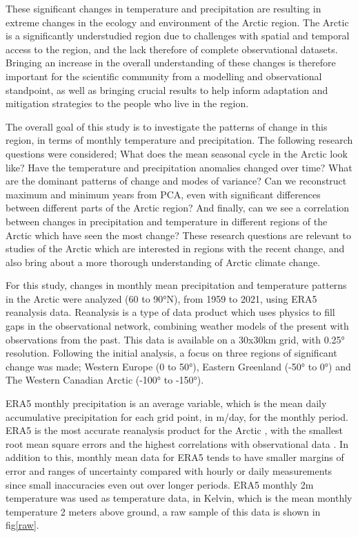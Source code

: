\documentclass[11pt, oneside]{article}
\begin{document}
These significant changes in temperature and precipitation are resulting in extreme changes in the ecology and environment of the Arctic region. The Arctic is a significantly understudied region due to challenges with spatial and temporal access to the region, and the lack therefore of complete observational datasets. Bringing an increase in the overall understanding of these changes is therefore important for the scientific community from a modelling and observational standpoint, as well as bringing crucial results to help inform adaptation and mitigation strategies to the people who live in the region.
 
The overall goal of this study is to investigate the patterns of change in this region, in terms of monthly temperature and precipitation. The following research questions were considered; What does the mean seasonal cycle in the Arctic look like? Have the temperature and precipitation anomalies changed over time? What are the dominant patterns of change and modes of variance? Can we reconstruct maximum and minimum years from PCA, even with significant differences between different parts of the Arctic region? And finally, can we see a correlation between changes in precipitation and temperature in different regions of the Arctic which have seen the most change? These research questions are relevant to studies of the Arctic which are interested in regions with the recent change, and also bring about a more thorough understanding of Arctic climate change.
 
For this study, changes in monthly mean precipitation and temperature patterns in the Arctic were analyzed (60 to 90°N), from 1959 to 2021, using ERA5 reanalysis data. Reanalysis is a type of data product which uses physics to fill gaps in the observational network, combining weather models of the present with observations from the past. This data is available on a 30x30km grid, with 0.25° resolution. Following the initial analysis, a focus on three regions of significant change was made; Western  Europe (0 to 50°), Eastern Greenland (-50° to 0°) and The Western Canadian Arctic (-100° to -150°).
 
ERA5 monthly precipitation is an average variable, which is the mean daily accumulative precipitation for each grid point, in m/day, for the monthly period. ERA5 is the most accurate reanalysis product for the Arctic \cite{hillebrand2021comparison}, with the smallest root mean square errors and the highest correlations with observational data \cite{graham2019improved}. In addition to this, monthly mean data for ERA5 tends to have smaller margins of error and ranges of uncertainty compared with hourly or daily measurements since small inaccuracies even out over longer periods. ERA5 monthly 2m temperature was used as temperature data, in Kelvin, which is the mean monthly temperature 2 meters above ground, a raw sample of this data is shown in fig\ref{raw}.
 
\end{document}
